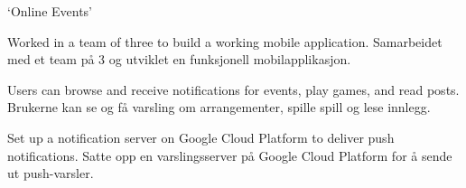 \cvselected
{`Online Events'}
{}
{}


\begin{cvbullets}
  \item \enor
  {Worked in a team of three to build a working mobile application.}
  {Samarbeidet med et team på 3 og utviklet en funksjonell
    mobilapplikasjon.}
  \item \enor
  {Users can browse and receive notifications for events, play
    games, and read posts.}
  {Brukerne kan se og få varsling om arrangementer, spille spill og
    lese innlegg.}
  \item \enor
  {Set up a notification server on Google Cloud Platform to deliver
    push notifications.}
  {Satte opp en varslingsserver på Google Cloud Platform for å sende
    ut push-varsler.}
\end{cvbullets}
